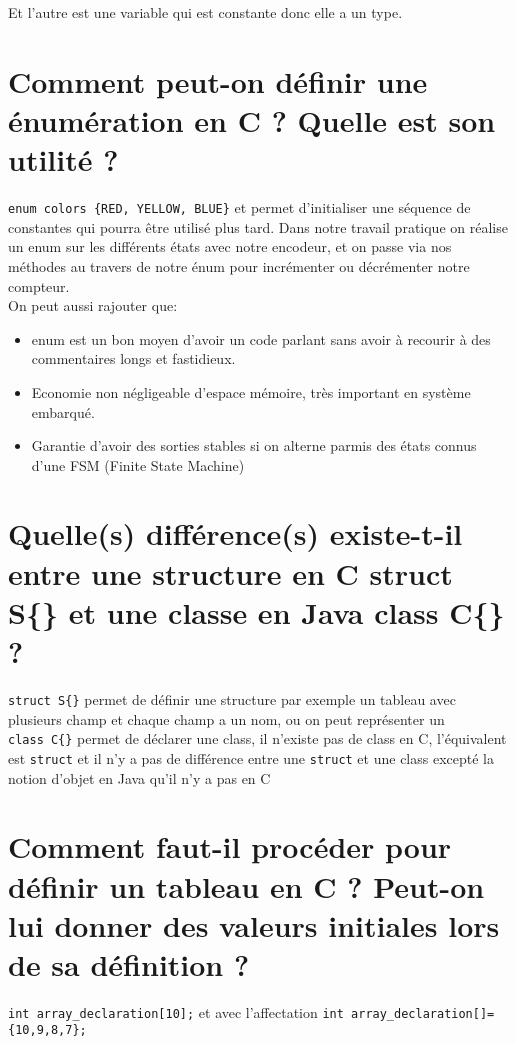 Et l'autre est une variable qui est constante donc elle a un type.  


\section{Comment peut-on définir une énumération en C ? Quelle est son utilité ?}
\texttt{enum colors \{RED, YELLOW, BLUE\}} et permet d'initialiser une séquence de constantes qui pourra être utilisé plus tard. Dans notre travail pratique on réalise un enum sur les différents états avec notre encodeur, et on passe via nos méthodes au travers de notre énum pour incrémenter ou décrémenter notre compteur.\\

On peut aussi rajouter que:
\begin{itemize}
   \item enum est un bon moyen d'avoir un code parlant sans avoir à recourir à des commentaires longs et fastidieux.
   \item Economie non négligeable d'espace mémoire, très important en système embarqué.
   \item Garantie d'avoir des sorties stables si on alterne parmis des états connus d'une FSM (Finite State Machine)\\
\end{itemize}


\section{Quelle(s) différence(s) existe-t-il entre une structure en C struct S\{\} et une classe en Java class C\{\} ?}
\texttt{struct S\{\}} permet de définir une structure par exemple un tableau avec plusieurs champ et chaque champ a un nom, ou on peut représenter un \\
\texttt{class C\{\}} permet de déclarer une class, il n'existe pas de class en C, l'équivalent est \texttt{struct} et il n'y a pas de différence entre une \texttt{struct} et une class excepté la notion d'objet en Java qu'il n'y a pas en C

\section{Comment faut-il procéder pour définir un tableau en C ? Peut-on lui donner des valeurs initiales lors de sa définition ?}
\texttt{int array\_declaration[10];} et avec l'affectation \texttt{int array\_declaration[]=\{10,9,8,7\};}

